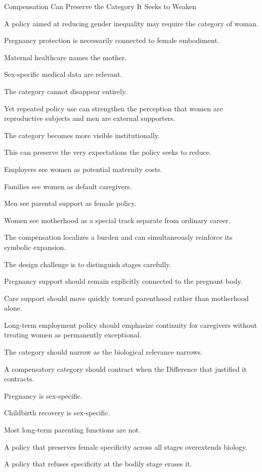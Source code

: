 Compensation Can Preserve the Category It Seeks to Weaken

A policy aimed at reducing gender inequality may require the category of woman.

Pregnancy protection is necessarily connected to female embodiment.

Maternal healthcare names the mother.

Sex-specific medical data are relevant.

The category cannot disappear entirely.

Yet repeated policy use can strengthen the perception that women are reproductive subjects and men are external supporters.

The category becomes more visible institutionally.

This can preserve the very expectations the policy seeks to reduce.

Employers see women as potential maternity costs.

Families see women as default caregivers.

Men see parental support as female policy.

Women see motherhood as a special track separate from ordinary career.

The compensation localizes a burden and can simultaneously reinforce its symbolic expansion.

The design challenge is to distinguish stages carefully.

Pregnancy support should remain explicitly connected to the pregnant body.

Care support should move quickly toward parenthood rather than motherhood alone.

Long-term employment policy should emphasize continuity for caregivers without treating women as permanently exceptional.

The category should narrow as the biological relevance narrows.

A compensatory category should contract when the Difference that justified it contracts.

Pregnancy is sex-specific.

Childbirth recovery is sex-specific.

Most long-term parenting functions are not.

A policy that preserves female specificity across all stages overextends biology.

A policy that refuses specificity at the bodily stage erases it.

